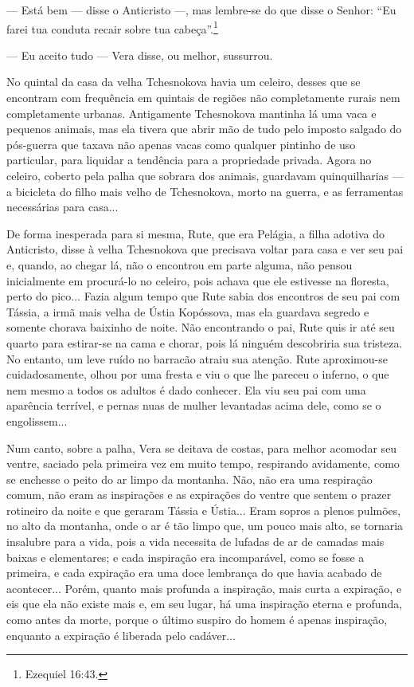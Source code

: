 --- Está bem --- disse o Anticristo ---, mas lembre-se do que disse o
Senhor: ``Eu farei tua conduta recair sobre tua cabeça''.\footnote{Ezequiel
  16:43.}

--- Eu aceito tudo --- Vera disse, ou melhor, sussurrou.

No quintal da casa da velha Tchesnokova havia um celeiro, desses que se
encontram com frequência em quintais de regiões não completamente rurais
nem completamente urbanas. Antigamente Tchesnokova mantinha lá uma vaca
e pequenos animais, mas ela tivera que abrir mão de tudo pelo imposto
salgado do pós-guerra que taxava não apenas vacas como qualquer pintinho
de uso particular, para liquidar a tendência para a propriedade privada.
Agora no celeiro, coberto pela palha que sobrara dos animais, guardavam
quinquilharias --- a bicicleta do filho mais velho de Tchesnokova, morto
na guerra, e as ferramentas necessárias para casa...

De forma inesperada para si mesma, Rute, que era Pelágia, a filha
adotiva do Anticristo, disse à velha Tchesnokova que precisava voltar
para casa e ver seu pai e, quando, ao chegar lá, não o encontrou em
parte alguma, não pensou inicialmente em procurá-lo no celeiro, pois
achava que ele estivesse na floresta, perto do pico... Fazia algum tempo
que Rute sabia dos encontros de seu pai com Tássia, a irmã mais velha de
Ústia Kopóssova, mas ela guardava segredo e somente chorava baixinho de
noite. Não encontrando o pai, Rute quis ir até seu quarto para
estirar-se na cama e chorar, pois lá ninguém descobriria sua tristeza.
No entanto, um leve ruído no barracão atraiu sua atenção. Rute
aproximou-se cuidadosamente, olhou por uma fresta e viu o que lhe
pareceu o inferno, o que nem mesmo a todos os adultos é dado conhecer.
Ela viu seu pai com uma aparência terrível, e pernas nuas de mulher
levantadas acima dele, como se o engolissem...

Num canto, sobre a palha, Vera se deitava de costas, para melhor
acomodar seu ventre, saciado pela primeira vez em muito tempo,
respirando avidamente, como se enchesse o peito do ar limpo da montanha.
Não, não era uma respiração comum, não eram as inspirações e as
expirações do ventre que sentem o prazer rotineiro da noite e que
geraram Tássia e Ústia... Eram sopros a plenos pulmões, no alto da
montanha, onde o ar é tão limpo que, um pouco mais alto, se tornaria
insalubre para a vida, pois a vida necessita de lufadas de ar de camadas
mais baixas e elementares; e cada inspiração era incomparável, como se
fosse a primeira, e cada expiração era uma doce lembrança do que havia
acabado de acontecer... Porém, quanto mais profunda a inspiração, mais
curta a expiração, e eis que ela não existe mais e, em seu lugar, há uma
inspiração eterna e profunda, como antes da morte, porque o último
suspiro do homem é apenas inspiração, enquanto a expiração é liberada
pelo cadáver...

